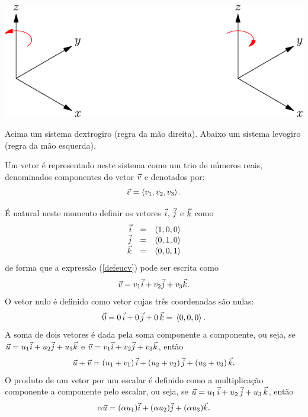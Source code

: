 \begin{marginfigure}%
 \includegraphics{./cap_algvet/pics/eixos_levo_destro}
      \caption{Acima um sistema dextrogiro (regra da mão direita). Abaixo um sistema levogiro (regra da mão esquerda). }
      \label{fig:marginfig}
  \end{marginfigure}
 
 Um vetor é representado neste sistema como um trio de números reais, denominados componentes do vetor $\vec{v}$ e denotados por: 
\begin{equation}\label{defeucv}\vec{v}=\left<v_1,v_2,v_3\right>.\end{equation}
  
É natural neste momento definir os vetores $\vec{i}$, $\vec{j}$ e $\vec{k}$ como
\begin{equation}\label{defijk}
\begin{array}{rcl}
\vec{i}&=&\left<1,0,0\right>\\
\vec{j}&=&\left<0,1,0\right>\\
\vec{k}&=&\left<0,0,1\right>
\end{array}
\end{equation}
de forma que a expressão (\ref{defeucv}) pode ser escrita como
\begin{equation}\label{repijk}\vec{v}=v_1  \vec{i}+v_2  \vec{j}+v_3 \vec{k}.\end{equation}
O vetor nulo é definido como vetor cujas três coordenadas são nulas:
\begin{equation}\label{defnulo}\vec{0}=0 ~\! \vec{i}+0~\!  \vec{j}+0~\!  \vec{k}= ~\!\left<0,0,0\right>.\end{equation}
A soma de dois vetores é dada pela soma componente a componente, ou seja, se $\vec{u}=u_1  \vec{i}+u_2\vec{j}+u_3 \vec{k}$ e $\vec{v}=v_1\vec{i}+v_2\vec{j}+v_3 \vec{k}$, então
\begin{equation}\label{defsoma}\vec{u}+\vec{v}= \left(u_1+v_1\right) \vec{i}+\left(u_2+v_2\right) \vec{j}+\left(u_3+v_3\right) \vec{k}.\end{equation}
O produto de um vetor por um escalar é definido como a multiplicação componente a componente pelo escalar, ou seja, se $\vec{u}=u_1~\!  \vec{i}+u_2~\!  \vec{j}+u_3 ~\! \vec{k}$, então
\begin{equation}\label{defprod}\alpha\vec{u}=(\alpha u_1)\vec{i}+(\alpha u_2)\vec{j}+(\alpha u_3) \vec{k} .\end{equation}

